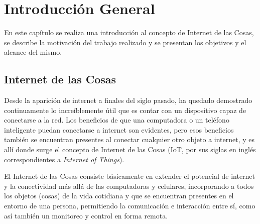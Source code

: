 
\chapter{Introducción General} %

\label{Chapter1} %
\label{IntroGeneral}


\newcommand{\keyword}[1]{\textbf{#1}}
\newcommand{\tabhead}[1]{\textbf{#1}}
\newcommand{\code}[1]{\texttt{#1}}
\newcommand{\file}[1]{\texttt{\bfseries#1}}
\newcommand{\option}[1]{\texttt{\itshape#1}}
\newcommand{\grados}{$^{\circ}$}




En este capítulo se realiza una introducción al concepto de Internet de las Cosas, se describe la motivación del trabajo realizado y se presentan los objetivos y el alcance del mismo.

\section{Internet de las Cosas{}}

Desde la aparición de internet a finales del siglo pasado, ha quedado demostrado continuamente lo increíblemente útil que es contar con un dispositivo capaz de conectarse a la red. Los beneficios de que una computadora o un teléfono inteligente puedan conectarse a internet son evidentes, pero esos beneficios también se encuentran presentes al conectar cualquier otro objeto a internet, y es allí donde surge el concepto de Internet de las Cosas (IoT, por sus siglas en inglés correspondientes a \emph{Internet of Things}).

El Internet de las Cosas consiste básicamente en extender el potencial de internet y la conectividad más allá de las computadoras y celulares, incorporando a todos los objetos (cosas) de la vida cotidiana y que se encuentran presentes en el entorno de una persona, permitiendo la comunicación e interacción entre sí, como así también un monitoreo y control en forma remota.

